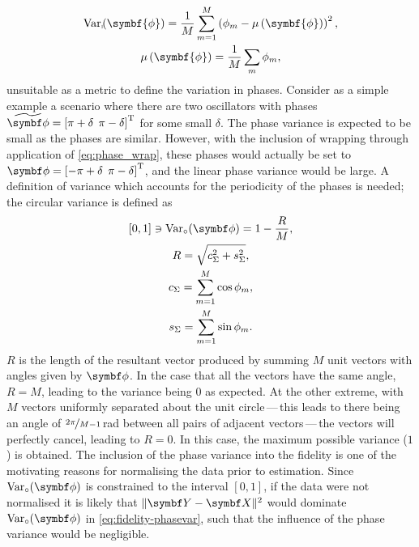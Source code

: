 \begin{subequations}
    \begin{gather}
        \Var_{\shortmid}\hspace*{-3pt}\left(\symbf{\phi}\right) =
            \frac{1}{M} \sum_{m=1}^{M} \left(\phi_m - \mu\left(\symbf{\phi}\right)\right)^2, \\
        \mu\left(\symbf{\phi}\right) = \frac{1}{M} \sum_{m} \phi_m,
    \end{gather}
\end{subequations}
unsuitable as a metric to define the variation in phases. Consider as a simple
example a scenario
where there are two oscillators with phases $\widetilde{\bdphi} = \left[ \pi +
\delta\:\:\pi - \delta \right]\T$ for some small $\delta$.
The phase variance is expected to be small as the phases are similar.
However, with the inclusion of wrapping through application of
\cref{eq:phase_wrap}, these phases would actually be set to $\bdphi = \left[
    -\pi
+ \delta\:\:\pi - \delta \right]\T$, and the linear phase
variance would be large. A definition of variance which accounts for the
periodicity of the phases is needed; the circular variance is defined
as\cite[Chapter 3]{Fisher1993}
\begin{subequations}
    \begin{gather}
        [0, 1] \ni \circvar = 1 - \frac{R}{M},\\
        R = \sqrt{c_{\Sigma}^2 + s_{\Sigma}^2}, \\
        c_{\Sigma} = \sum_{m=1}^M \cos \phi_m, \\
        s_{\Sigma} = \sum_{m=1}^M \sin \phi_m.
    \end{gather}
\end{subequations}
$R$ is the length of the resultant vector produced by summing $M$ unit vectors
with angles given by $\bdphi$. In the case that all the vectors have the
same angle, $R=M$, leading to the variance being $0$ as expected. At the other
extreme, with $M$ vectors uniformly separated about the unit circle\,---\,this leads to there being an angle of $\nicefrac{2 \pi}{M - 1}$\,\unit{\radian} between all
pairs of adjacent vectors\,---\,the
vectors will perfectly cancel, leading to $R=0$. In this case, the maximum
possible variance ($1$) is obtained.
The inclusion of the phase variance into the fidelity is one of the
motivating reasons for normalising the data prior to estimation. Since
$\circvar$ is constrained to the interval $[0, 1]$, if the data were not
normalised it is likely that $\lVert \bY - \bX \rVert^2$ would dominate
$\circvar$ in \cref{eq:fidelity-phasevar}, such that the influence of the phase
variance would be negligible.

